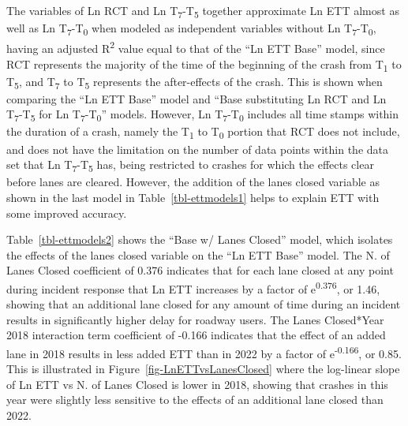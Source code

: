 \documentclass[
  letterpaper,
  authoryear]{elsarticle}
\begin{document}
The variables of Ln RCT and Ln T\textsubscript{7}-T\textsubscript{5}
together approximate Ln ETT almost as well as Ln
T\textsubscript{7}-T\textsubscript{0} when modeled as independent
variables without Ln T\textsubscript{7}-T\textsubscript{0}, having an
adjusted R\textsuperscript{2} value equal to that of the ``Ln ETT Base''
model, since RCT represents the majority of the time of the beginning of
the crash from T\textsubscript{1} to T\textsubscript{5}, and
T\textsubscript{7} to T\textsubscript{5} represents the after-effects of
the crash. This is shown when comparing the ``Ln ETT Base'' model and
``Base substituting Ln RCT and Ln T\textsubscript{7}-T\textsubscript{5}
for Ln T\textsubscript{7}-T\textsubscript{0}'' models. However, Ln
T\textsubscript{7}-T\textsubscript{0} includes all time stamps within
the duration of a crash, namely the T\textsubscript{1} to
T\textsubscript{0} portion that RCT does not include, and does not have
the limitation on the number of data points within the data set that Ln
T\textsubscript{7}-T\textsubscript{5} has, being restricted to crashes
for which the effects clear before lanes are cleared. However, the
addition of the lanes closed variable as shown in the last model in
Table~\ref{tbl-ettmodels1} helps to explain ETT with some improved
accuracy.

Table~\ref{tbl-ettmodels2} shows the ``Base w/ Lanes Closed'' model,
which isolates the effects of the lanes closed variable on the ``Ln ETT
Base'' model. The N. of Lanes Closed coefficient of 0.376 indicates that
for each lane closed at any point during incident response that Ln ETT
increases by a factor of e\textsuperscript{0.376}, or 1.46, showing that
an additional lane closed for any amount of time during an incident
results in significantly higher delay for roadway users. The Lanes
Closed*Year 2018 interaction term coefficient of -0.166 indicates that
the effect of an added lane in 2018 results in less added ETT than in
2022 by a factor of e\textsuperscript{-0.166}, or 0.85. This is
illustrated in Figure~\ref{fig-LnETTvsLanesClosed} where the log-linear
slope of Ln ETT vs N. of Lanes Closed is lower in 2018, showing that
crashes in this year were slightly less sensitive to the effects of an
additional lane closed than 2022.
\end{document}

